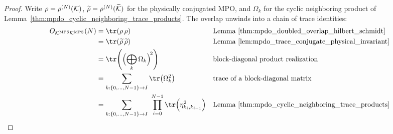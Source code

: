 \begin{proof}
    \leanok
    Write $\rho=\rho^{(N)}({\cal K})$, $\widetilde\rho=\rho^{(N)}(\widetilde{\cal K})$
    for the physically conjugated MPO, and $\Omega_k$ for the cyclic
    neighboring product of Lemma~\ref{thm:mpdo_cyclic_neighboring_trace_products}.
    The overlap unwinds into a chain of trace identities:
    \begin{align}
        O_{{\cal K}^{\mathrm{MPS}}{\cal K}^{\mathrm{MPS}}}(N)
         & =\tr(\rho\,\rho)
         &                                                                       & \text{Lemma~\ref{thm:mpdo_doubled_overlap_hilbert_schmidt}}
        \notag                                                                                                                                    \\
         & =\tr(\widetilde\rho\,\widetilde\rho)
         &                                                                       & \text{Lemma~\ref{lem:mpdo_trace_conjugate_physical_invariant}}
        \notag                                                                                                                                    \\
         & =\tr\!\left(\Bigl(\bigoplus_{k}\Omega_k\Bigr)^{\!2}\right)
         &                                                                       & \text{block-diagonal product realization}
        \notag                                                                                                                                    \\
         & =\sum_{k:\{0,\ldots,N-1\}\to I}\tr\!\left(\Omega_k^2\right)
         &                                                                       & \text{trace of a block-diagonal matrix}
        \notag                                                                                                                                    \\
         & =\sum_{k:\{0,\ldots,N-1\}\to I}\ \prod_{i=0}^{N-1}
        \tr\!\left(\eta_{k_i,k_{i+1}}^2\right)
         &                                                                       & \text{Lemma~\ref{thm:mpdo_cyclic_neighboring_trace_products}}
        \notag                                                                                                                                    \\

\end{align}
\end{proof}
